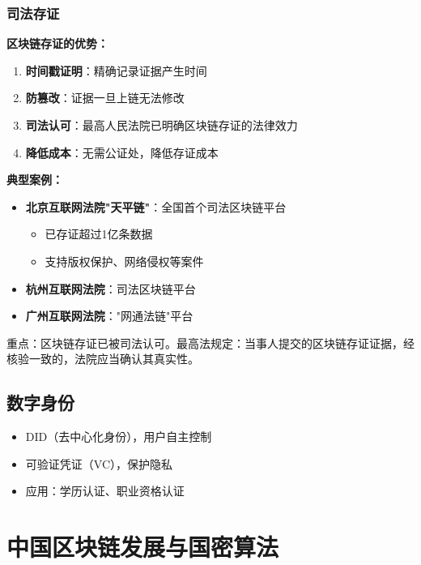﻿\documentclass[12pt,a4paper]{article}
\begin{document}
\subsubsection{司法存证}

\begin{theorybox}
\textbf{区块链存证的优势：}
\begin{enumerate}
\item \textbf{时间戳证明}：精确记录证据产生时间
\item \textbf{防篡改}：证据一旦上链无法修改
\item \textbf{司法认可}：最高人民法院已明确区块链存证的法律效力
\item \textbf{降低成本}：无需公证处，降低存证成本
\end{enumerate}
\end{theorybox}

\textbf{典型案例：}
\begin{itemize}[leftmargin=1.5em]
\item \textbf{北京互联网法院"天平链"}：全国首个司法区块链平台
  \begin{itemize}
  \item 已存证超过1亿条数据
  \item 支持版权保护、网络侵权等案件
  \end{itemize}
\item \textbf{杭州互联网法院}：司法区块链平台
\item \textbf{广州互联网法院}："网通法链"平台
\end{itemize}

\begin{keypointbox}
重点：区块链存证已被司法认可。最高法规定：当事人提交的区块链存证证据，经核验一致的，法院应当确认其真实性。
\end{keypointbox}

\subsection{数字身份}

\begin{itemize}[leftmargin=1.5em]
\item DID（去中心化身份），用户自主控制
\item 可验证凭证（VC），保护隐私
\item 应用：学历认证、职业资格认证
\end{itemize}

\section{中国区块链发展与国密算法}
\end{document}
